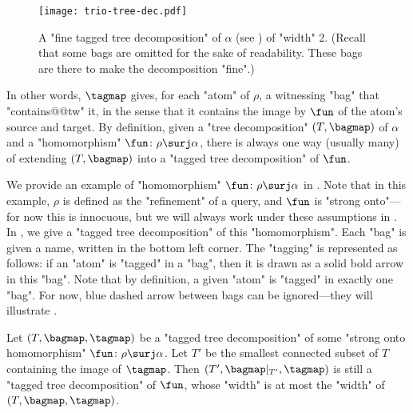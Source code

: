 \begin{figure}[tbp]
	\centering
	\texttt{[image: trio-tree-dec.pdf]}
	\caption{
		\AP\label{fig:trio-tree-dec}
		A "fine tagged tree decomposition" of $\alpha$ (see ) of "width" 2.
		(Recall that some bags are omitted for the sake of readability. These bags
		are there to make the decomposition "fine".)
	}
\end{figure}

In other words, $\tagmap$ gives,
for each "atom" of $\rho$, a witnessing "bag" that "contains@@tw" it, in the sense that
it contains the image by $\fun$ of the atom's source and target.
By definition, given a "tree decomposition" $(T, \bagmap)$ of $\alpha$ and a "homomorphism"
$\fun\colon \rho \surj \alpha$, there is always one way (usually many) of extending $(T, \bagmap)$
into a "tagged tree decomposition" of $\fun$.

We provide an example of "homomorphism" $\fun\colon \rho \surj \alpha$ in . Note 
that in this example, $\rho$ is defined as the "refinement" of a query, and $\fun$ is "strong 
onto"---for now this is innocuous, but we will always work under these
assumptions in . In , we give a "tagged tree 
decomposition" of this "homomorphism". Each "bag" is given a name, written in the bottom left 
corner. The "tagging" is represented as follows: if an "atom" is "tagged" in a "bag", then it
is drawn as a solid bold arrow in this "bag". Note that by definition, a given "atom" is "tagged" in
exactly one "bag". For now, blue dashed arrow between bags can be ignored---they will illustrate .

\begin{fact}
    \AP\label{fact:restriction_tagged_treedec}
    Let $(T, \bagmap, \tagmap)$ be a "tagged tree decomposition" of some "strong onto homomorphism"
    $\fun\colon \rho \surj \alpha$.
    Let $T'$ be the smallest connected subset of $T$ containing the image of $\tagmap$.
    Then $(T', \bagmap\vert_{T'}, \tagmap)$ is still a "tagged tree decomposition" of $\fun$,
    whose "width" is at most the "width" of $(T, \bagmap, \tagmap)$.
\end{fact}


